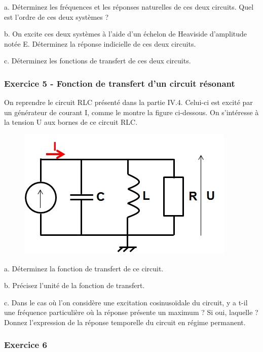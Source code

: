 \documentclass[]{report}
\begin{document}
	a. Déterminez les fréquences et les réponses naturelles de ces deux circuits. Quel est l'ordre de ces deux systèmes ? 
	
	b. On excite ces deux systèmes à l'aide d'un échelon de Heaviside d'amplitude notée E. Déterminez la réponse indicielle de ces deux circuits. 
	
	c. Déterminez les fonctions de transfert de ces deux circuits.
	
	\vspace{1\baselineskip}
	
	\subsubsection{Exercice 5 - Fonction de transfert d'un circuit résonant}
	
	On reprendre le circuit RLC présenté dans la partie IV.4. Celui-ci est excité par un générateur de courant I, comme le montre la figure ci-dessous. On s'intéresse à la tension U aux bornes de ce circuit RLC. 
	
	\begin{figure}[h!]
		\centering
		\includegraphics[scale=0.5]{images/Exo_2_5.jpg} 
	\end{figure} 
	
	a. Déterminez la fonction de transfert de ce circuit. 
	
	b. Précisez l'unité de la fonction de transfert. 
	
	c. Dans le cas où l'on considère une excitation cosinusoïdale du circuit, y a t-il une fréquence particulière où la réponse présente un maximum ? Si oui, laquelle ? Donnez l'expression de la réponse temporelle du circuit en régime permanent.
	
	\vspace{1\baselineskip}
	
	\subsubsection{Exercice 6}
	
\end{document}
